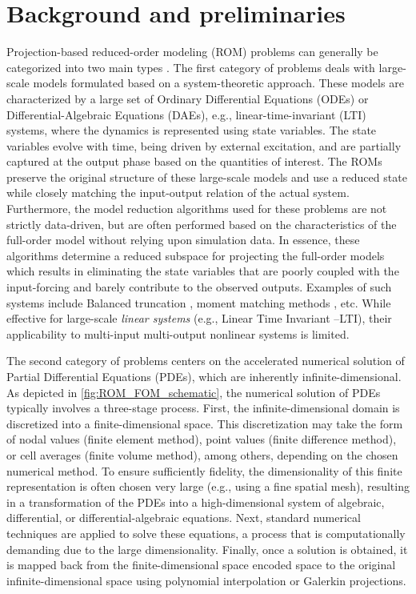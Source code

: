\documentclass[11pt]{article}
\begin{document}
    \section{Background and preliminaries}


    Projection-based reduced-order modeling (ROM) problems can generally be categorized into two main types \cite{benner_2021}.
    The first category of problems deals with large-scale models formulated based on a system-theoretic approach.
    These models are characterized by a large set of Ordinary Differential Equations (ODEs) or Differential-Algebraic Equations (DAEs), e.g., linear-time-invariant (LTI) systems, where the dynamics is represented using state variables.
    The state variables evolve with time, being driven by external excitation, and are partially captured at the output phase based on the quantities of interest.
    The ROMs preserve the original structure of these large-scale models and use a reduced state while closely matching the input-output relation of the actual system.
    Furthermore, the model reduction algorithms used for these problems are not strictly data-driven, but are often performed based on the characteristics of the full-order model without relying upon simulation data.
    In essence, these algorithms determine a reduced subspace for projecting the full-order models which results in eliminating the state variables that are poorly coupled with the input-forcing and barely contribute to the observed outputs.
    Examples of such systems include Balanced truncation \cite{moore2003principal}, moment matching methods \cite{benner2015survey,rowley2005model}, etc.
    While effective for large-scale \textit{linear systems} (e.g., Linear Time Invariant --LTI), their applicability to multi-input multi-output nonlinear systems is limited.



    The second category of problems centers on the accelerated numerical solution of Partial Differential Equations (PDEs), which are inherently infinite-dimensional.
    As depicted in \cref{fig:ROM_FOM_schematic}, the numerical solution of PDEs typically involves a three-stage process.
    First, the infinite-dimensional domain is discretized into a finite-dimensional space.
    This discretization may take the form of nodal values (finite element method), point values (finite difference method), or cell averages (finite volume method), among others, depending on the chosen numerical method.
    To ensure sufficiently fidelity, the dimensionality of this finite representation is often chosen very large (e.g., using a fine spatial mesh), resulting in a transformation of the PDEs into a high-dimensional system of algebraic, differential, or differential-algebraic equations.
    Next, standard numerical techniques are applied to solve these equations, a process that is computationally demanding due to the large dimensionality.
    Finally, once a solution is obtained, it is mapped back from the finite-dimensional space encoded space to the original infinite-dimensional space using polynomial interpolation or Galerkin projections.
\end{document}
